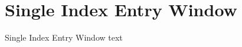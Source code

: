 

\section{Single Index Entry Window}\fbeg{}\begin{frame}{}

{\fontsize{20}{23}\selectfont

Single Index Entry Window text

}

\end{frame}


